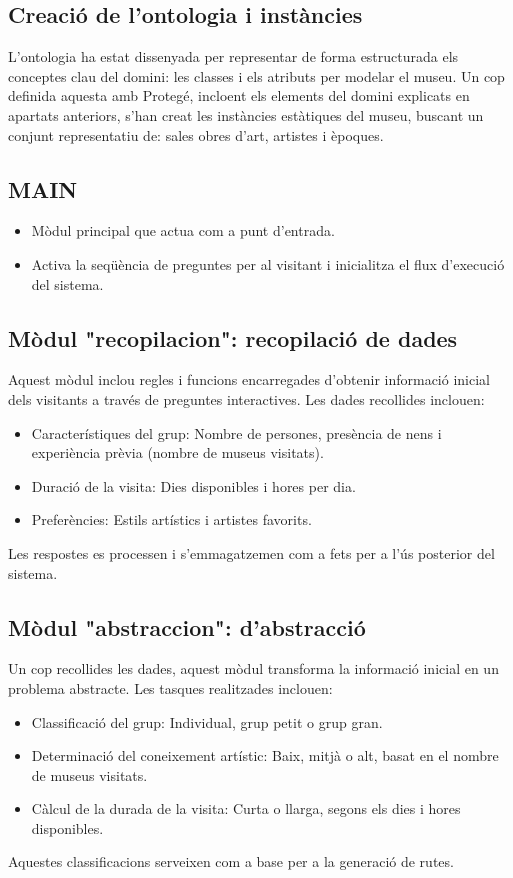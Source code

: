 \documentclass[a4paper]{article}
\begin{document}
	\subsection{Creació de l’ontologia i instàncies}
	
	L’ontologia ha estat dissenyada per representar de forma estructurada els conceptes clau del domini: les classes i els atributs per modelar el museu. Un cop definida aquesta amb Protegé, incloent els elements del domini explicats en apartats anteriors, s'han creat les instàncies estàtiques del museu, buscant un conjunt representatiu de: sales obres d'art, artistes i èpoques.
	
	\subsection{MAIN}
	\begin{itemize}
		\item Mòdul principal que actua com a punt d’entrada.
		\item Activa la seqüència de preguntes per al visitant i inicialitza el flux d’execució del sistema.
	\end{itemize}
	
	
	\subsection{Mòdul "recopilacion": recopilació de dades}
	
	Aquest mòdul inclou regles i funcions encarregades d'obtenir informació inicial dels visitants a través de preguntes interactives. Les dades recollides inclouen:
	\begin{itemize}
		\item Característiques del grup: Nombre de persones, presència de nens i experiència prèvia (nombre de museus visitats).
		\item Duració de la visita: Dies disponibles i hores per dia.
		\item Preferències: Estils artístics i artistes favorits.
	\end{itemize}
	Les respostes es processen i s'emmagatzemen com a fets per a l'ús posterior del sistema.
	
	
	\subsection{Mòdul "abstraccion": d’abstracció}
	
	Un cop recollides les dades, aquest mòdul transforma la informació inicial en un problema abstracte. Les tasques realitzades inclouen:
	\begin{itemize}
		\item Classificació del grup: Individual, grup petit o grup gran.
		\item Determinació del coneixement artístic: Baix, mitjà o alt, basat en el nombre de museus visitats.
		\item Càlcul de la durada de la visita: Curta o llarga, segons els dies i hores disponibles.
	\end{itemize}
	Aquestes classificacions serveixen com a base per a la generació de rutes.
	
\end{document}
